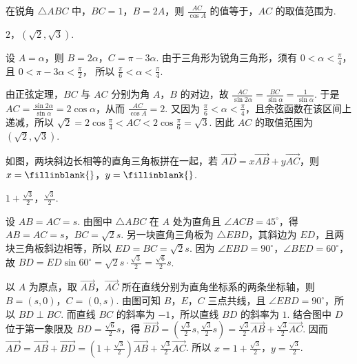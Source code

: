 \begin{problem}
在锐角 \(\triangle ABC\) 中，\(BC = 1\)，\(B = 2A\)，则 \(\frac{AC}{\cos A}\) 的值等于\fillinblank{}，\(AC\) 的取值范围为\fillinblank{}.
\end{problem}

\begin{answer}
\(2\)，\((\sqrt{2},\sqrt{3})\).
\end{answer}

\begin{solution}
设 \(A=\alpha\)，则 \(B=2\alpha\)，\(C=\pi-3\alpha\). 由于三角形为锐角三角形，须有 \(0<\alpha<\frac{\pi}{4}\)，且 \(0<\pi-3\alpha<\frac{\pi}{2}\)，
所以 \(\frac{\pi}{6}<\alpha<\frac{\pi}{4}\).

由正弦定理，\(BC\) 与 \(AC\) 分别为角 \(A\)，\(B\) 的对边，故 \(\frac{AC}{\sin2\alpha}=\frac{BC}{\sin\alpha}=\frac{1}{\sin\alpha}\). 于是 \(AC=\frac{\sin2\alpha}{\sin\alpha}=2\cos\alpha\)，从而 \(\frac{AC}{\cos A}=2\). 又因为 \(\frac{\pi}{6}<\alpha<\frac{\pi}{4}\)，且余弦函数在该区间上递减，所以 \(\sqrt{2}=2\cos\frac{\pi}{4}<AC<2\cos\frac{\pi}{6}=\sqrt{3}\).
因此 \(AC\) 的取值范围为 \((\sqrt{2},\sqrt{3})\).
\end{solution}

\begin{problem}
如图，两块斜边长相等的直角三角板拼在一起，若 \(\overrightarrow{AD} = x\overrightarrow{AB} + y\overrightarrow{AC}\)，则 \(x =\fillinblank{}\)，\(y =\fillinblank{}\).

\end{problem}

\begin{answer}
\(1 + \frac{\sqrt{3}}{2}\)，\(\frac{\sqrt{3}}{2}\).
\end{answer}

\begin{solution}
设 \(AB=AC=s\). 由图中 \(\triangle ABC\) 在 \(A\) 处为直角且 \(\angle ACB=45^\circ\)，得 \(AB=AC=s\)，\(BC=\sqrt{2}s\). 另一块直角三角板为 \(\triangle EBD\)，其斜边为 \(ED\)，且两块三角板斜边相等，所以 \(ED=BC=\sqrt{2}s\). 因为 \(\angle EBD=90^\circ\)，\(\angle BED=60^\circ\)，故 \(BD=ED\sin60^\circ=\sqrt{2}s\cdot\frac{\sqrt{3}}{2}=\frac{\sqrt{6}}{2}s\).

以 \(A\) 为原点，取 \(\overrightarrow{AB}\)，\(\overrightarrow{AC}\) 所在直线分别为直角坐标系的两条坐标轴，则 \(B=(s,0)\)，\(C=(0,s)\). 由图可知 \(B\)，\(E\)，\(C\) 三点共线，且 \(\angle EBD=90^\circ\)，所以 \(BD\perp BC\). 而直线 \(BC\) 的斜率为 \(-1\)，所以直线 \(BD\) 的斜率为 \(1\). 结合图中 \(D\) 位于第一象限及 \(BD=\frac{\sqrt{6}}{2}s\)，得 \(\overrightarrow{BD}=\left(\frac{\sqrt{3}}{2}s,\frac{\sqrt{3}}{2}s\right)=\frac{\sqrt{3}}{2}\overrightarrow{AB}+\frac{\sqrt{3}}{2}\overrightarrow{AC}\). 因而 \(\overrightarrow{AD}=\overrightarrow{AB}+\overrightarrow{BD}=\left(1+\frac{\sqrt{3}}{2}\right)\overrightarrow{AB}+\frac{\sqrt{3}}{2}\overrightarrow{AC}\).
所以 \(x=1+\frac{\sqrt{3}}{2}\)，\(y=\frac{\sqrt{3}}{2}\).
\end{solution}

